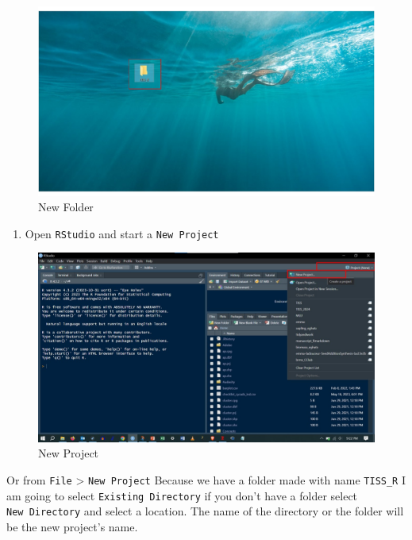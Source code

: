 \documentclass[
]{book}
\providecommand{\tightlist}{%
  \setlength{\itemsep}{0pt}\setlength{\parskip}{0pt}}
\begin{document}
\begin{figure}

{\centering \includegraphics[width=0.7\linewidth]{pictures/Slide6} 

}

\caption{New Folder}\label{fig:unnamed-chunk-4}
\end{figure}

\begin{enumerate}
\def\labelenumi{\arabic{enumi}.}
\setcounter{enumi}{1}
\tightlist
\item
  Open \texttt{RStudio} and start a \texttt{New\ Project}
\end{enumerate}

\begin{figure}

{\centering \includegraphics[width=0.7\linewidth]{pictures/Slide7} 

}

\caption{New Project}\label{fig:unnamed-chunk-5}
\end{figure}

Or from \texttt{File} \textgreater{} \texttt{New\ Project}
Because we have a folder made with name \texttt{TISS\_R} I am going to select \texttt{Existing\ Directory} if you don't have a folder select \texttt{New\ Directory} and select a location. The name of the directory or the folder will be the new project's name.
\end{document}
